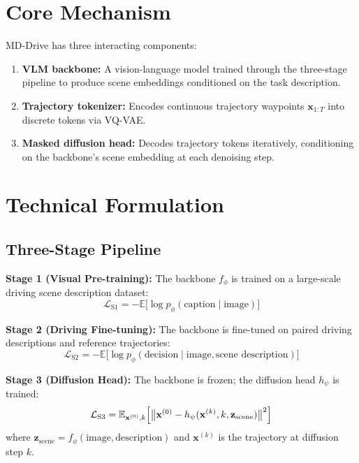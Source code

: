 \documentclass[10pt,twocolumn]{article}
\begin{document}
\section{Core Mechanism}

MD-Drive has three interacting components:
\begin{enumerate}[leftmargin=1.5em,itemsep=2pt]
  \item \textbf{VLM backbone:} A vision-language model trained through the three-stage pipeline to produce scene embeddings conditioned on the task description.
  \item \textbf{Trajectory tokenizer:} Encodes continuous trajectory waypoints $\mathbf{x}_{1:T}$ into discrete tokens via VQ-VAE.
  \item \textbf{Masked diffusion head:} Decodes trajectory tokens iteratively, conditioning on the backbone's scene embedding at each denoising step.
\end{enumerate}

\section{Technical Formulation}

\subsection*{Three-Stage Pipeline}

\textbf{Stage 1 (Visual Pre-training):}
The backbone $f_\phi$ is trained on a large-scale driving scene description dataset:
\begin{equation}
\mathcal{L}_{\text{S1}} = -\mathbb{E}\bigl[\log p_\phi(\text{caption} \mid \text{image})\bigr]
\end{equation}

\textbf{Stage 2 (Driving Fine-tuning):}
The backbone is fine-tuned on paired driving descriptions and reference trajectories:
\begin{equation}
\mathcal{L}_{\text{S2}} = -\mathbb{E}\bigl[\log p_\phi(\text{decision} \mid \text{image}, \text{scene description})\bigr]
\end{equation}

\textbf{Stage 3 (Diffusion Head):}
The backbone is frozen; the diffusion head $h_\psi$ is trained:
\begin{equation}
\mathcal{L}_{\text{S3}} = \mathbb{E}_{\mathbf{x}^{(0)}, k}\Bigl[\bigl\|\mathbf{x}^{(0)} - h_\psi(\mathbf{x}^{(k)}, k, \mathbf{z}_{\text{scene}})\bigr\|^2\Bigr]
\end{equation}
where $\mathbf{z}_{\text{scene}} = f_\phi(\text{image}, \text{description})$ and $\mathbf{x}^{(k)}$ is the trajectory at diffusion step $k$.
\end{document}
